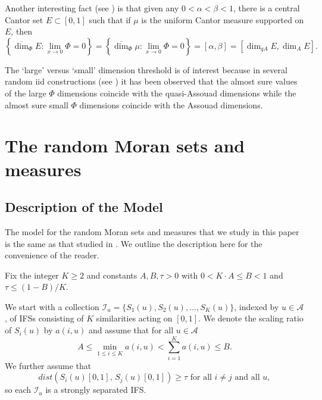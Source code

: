 \documentclass{amsart}
\theoremstyle{plain}
\numberwithin{equation}{section}
\newcommand{\cI}{{\mathcal I}}
\newcommand{\cA}{{\mathcal A}}
\newcommand{\odim}{\overline{\dim}}
\begin{document}
Another interesting fact (see \cite{HH}) is that given any $0<\alpha <\beta<1$, there is a central Cantor set $E\subset [0,1]$ such that if $\mu$ is the uniform Cantor measure supported on $E$, then
\begin{equation*}
   \left\{ \odim_{\Phi}E:\lim_{x\rightarrow 0}\Phi =0\right\}
       =\left\{ \odim_{\Phi}\mu :\lim_{x\rightarrow 0}\Phi =0\right\}
             =[\alpha ,\beta ]=[\dim_{qA}E,\dim_{A}E].
\end{equation*}

The `large' versus `small' dimension threshold is of interest because in
several random iid constructions (see \cite{GHM2, HM2, Tr2}) it has been
observed that the almost sure values of the large $\Phi$ dimensions
coincide with the quasi-Assouad dimensions while the almost sure small $\Phi$ dimensions coincide with the Assouad dimensions.

\section{The random Moran sets and measures}

\label{sec:construction}

\subsection{Description of the Model}

The model for the random Moran sets and measures that we study in this paper
is the same as that studied in \cite{HM, HM2}. 
We outline the description here for the convenience of the reader.


Fix the integer $K \ge 2$ and constants $A,B, \tau > 0$ with $0 < K \cdot A \le B < 1$ and $\tau \le (1-B)/K$.

We start with a collection $\cI_u = \{ S_1(u), S_2(u), \ldots, S_K(u) \}$, indexed by $u \in \cA$, of IFSs consisting of $K$ similarities
acting on $[0,1]$.
We denote the scaling ratio of $S_i(u)$ by $a(i,u)$ and assume that for all $u \in \cA$
\begin{equation} \label{eq:scaling_constraints}
     A \le \min_{1\le i \le K} a(i,u) < \sum_{i=1}^K a(i,u) \le B.
\end{equation}
We further assume that 
\begin{equation*}
     dist(S_{i}(u)[0,1],\,S_{j}(u)[0,1])\geq \tau \text{ for all } i\neq j \text{ and all } u,
\end{equation*}%
so each $\cI_u$ is a strongly separated IFS.
\end{document}
